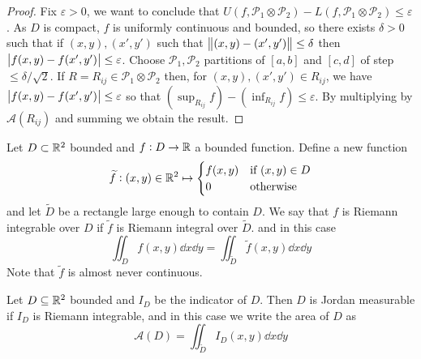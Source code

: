 \documentclass[12pt]{extarticle}
\begin{document}
\begin{proof}
    Fix $\varepsilon > 0$, we want to conclude that $U(f, \mathcal P_1 \otimes \mathcal P_2) - L(f, \mathcal P_1 \otimes \mathcal P_2) \leq \varepsilon$.
    As $D$ is compact, $f$ is uniformly continuous and bounded, so there exists $\delta > 0$ such that if $(x, y), (x', y')$ such that $\norm{(x, y) - (x', y')} \leq \delta$ then $\abs{f(x, y) - f(x', y')}\leq \varepsilon$.
    Choose $\mathcal P_1, \mathcal P_2$ partitions of $[a, b]$ and $[c, d]$ of step $\leq \delta / \sqrt{2}$. If $R = R_{ij} \in \mathcal P_1 \otimes \mathcal P_2$ then, for $(x, y), (x', y') \in R_{ij}$, we have $\abs{f(x, y) - f(x', y')}\leq \varepsilon$ so that $(\sup_{R_{ij}} f) - (\inf_{R_{ij}} f) \leq \varepsilon$.
    By multiplying by $\mathcal A(R_{ij})$ and summing we obtain the result.
\end{proof}

\begin{definition}
    Let $D\subset \mathbb{R}^2$ bounded and $f:D \to \mathbb{R}$ a bounded function.
    Define a new function
    \begin{equation}
        \widetilde{f} : (x, y) \in \mathbb{R}^2 \mapsto \begin{cases}
            f(x, y) & \text{if } (x, y) \in D \\
            0       & \text{otherwise}
        \end{cases}
    \end{equation}
    and let $\widetilde{D}$ be a rectangle large enough to contain $D$.
    We say that $f$ is Riemann integrable over $D$ if $\widetilde{f}$ is Riemann integral over $\widetilde{D}$. and in this case
    \begin{equation}
        \iint_D f(x, y) \dd{x} \dd{y} = \iint_{\widetilde{D}} \widetilde{f}(x, y)\dd{x}\dd{y}
    \end{equation}
    Note that $\widetilde{f}$ is almost never continuous.
\end{definition}

\begin{definition}
    Let $D \subseteq \mathbb{R}^2$ bounded and $I_D$ be the indicator of $D$.
    Then $D$ is Jordan measurable if $I_D$ is Riemann integrable, and in this case we write the area of $D$ as
    \begin{equation}
        \mathcal A(D) = \iint_{\widetilde{D}} I_D(x, y) \dd{x} \dd{y}
    \end{equation}
\end{definition}
\end{document}
